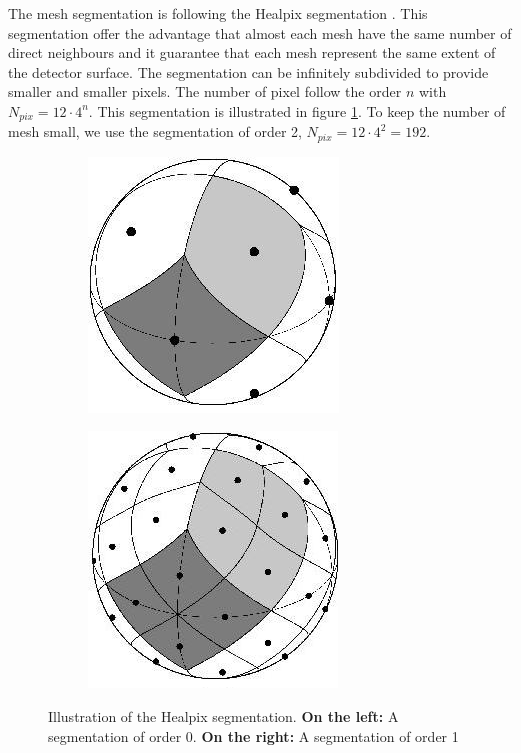 \documentclass[../main.tex]{subfiles}
\begin{document}
The mesh segmentation is following the Healpix segmentation \cite{gorski_healpix_2005}. This segmentation offer the advantage that almost each mesh have the same number of direct neighbours and it guarantee that each mesh represent the same extent of the detector surface. The segmentation can be infinitely subdivided to provide smaller and smaller pixels. The number of pixel follow the order $n$ with $N_{pix} = 12 \cdot 4^n$. This segmentation is illustrated in figure \ref{fig:jgnn:healpix}. To keep the number of mesh small, we use the segmentation of order 2, $N_{pix} = 12 \cdot 4^2 = 192$.

\begin{figure}
  \centering
  \begin{subfigure}[t]{0.48\linewidth}
    \centering
    \includegraphics[width=0.5\linewidth]{images/jgnn/healpix_0.jpg}
  \end{subfigure}
  \hfill
  \begin{subfigure}[t]{0.48\linewidth}
    \centering
    \includegraphics[width=0.5\linewidth]{images/jgnn/healpix_1.jpg}
  \end{subfigure}
  \caption{Illustration of the Healpix segmentation. \textbf{On the left:} A segmentation of order 0. \textbf{On the right:} A segmentation of order 1}
  \label{fig:jgnn:healpix}
\end{figure}
\end{document}
